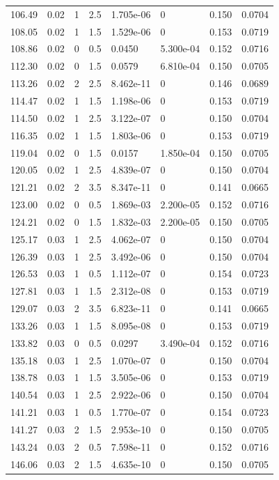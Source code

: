 \documentclass[preview]{standalone}
\begin{document}
{{{\begin{tabular}{L{1.2cm}C{1.2cm} C{0.3cm}C{0.5cm} C{1.4cm}C{1.4cm} C{1.4cm}C{1.4cm}}
  106.49  &  0.02  & 1     & 2.5 &  1.705e-06  & 0  & 0.150 &  0.0704   \\ 
  108.05  &  0.02  & 1     & 1.5 &  1.529e-06  & 0  & 0.153 &  0.0719   \\ 
  108.86  &  0.02  & 0     & 0.5 &  0.0450  & 5.300e-04  & 0.152 &  0.0716   \\ 
  112.30  &  0.02  & 0     & 1.5 &  0.0579  & 6.810e-04  & 0.150 &  0.0705   \\ 
  113.26  &  0.02  & 2     & 2.5 &  8.462e-11  & 0  & 0.146 &  0.0689   \\ 
  114.47  &  0.02  & 1     & 1.5 &  1.198e-06  & 0  & 0.153 &  0.0719   \\ 
  114.50  &  0.02  & 1     & 2.5 &  3.122e-07  & 0  & 0.150 &  0.0704   \\ 
  116.35  &  0.02  & 1     & 1.5 &  1.803e-06  & 0  & 0.153 &  0.0719   \\ 
  119.04  &  0.02  & 0     & 1.5 &  0.0157  & 1.850e-04  & 0.150 &  0.0705   \\ 
  120.05  &  0.02  & 1     & 2.5 &  4.839e-07  & 0  & 0.150 &  0.0704   \\ 
  121.21  &  0.02  & 2     & 3.5 &  8.347e-11  & 0  & 0.141 &  0.0665   \\ 
  123.00  &  0.02  & 0     & 0.5 &  1.869e-03  & 2.200e-05  & 0.152 &  0.0716   \\ 
  124.21  &  0.02  & 0     & 1.5 &  1.832e-03  & 2.200e-05  & 0.150 &  0.0705   \\ 
  125.17  &  0.03  & 1     & 2.5 &  4.062e-07  & 0  & 0.150 &  0.0704   \\ 
  126.39  &  0.03  & 1     & 2.5 &  3.492e-06  & 0  & 0.150 &  0.0704   \\ 
  126.53  &  0.03  & 1     & 0.5 &  1.112e-07  & 0  & 0.154 &  0.0723   \\ 
  127.81  &  0.03  & 1     & 1.5 &  2.312e-08  & 0  & 0.153 &  0.0719   \\ 
  129.07  &  0.03  & 2     & 3.5 &  6.823e-11  & 0  & 0.141 &  0.0665   \\ 
  133.26  &  0.03  & 1     & 1.5 &  8.095e-08  & 0  & 0.153 &  0.0719   \\ 
  133.82  &  0.03  & 0     & 0.5 &  0.0297  & 3.490e-04  & 0.152 &  0.0716   \\ 
  135.18  &  0.03  & 1     & 2.5 &  1.070e-07  & 0  & 0.150 &  0.0704   \\ 
  138.78  &  0.03  & 1     & 1.5 &  3.505e-06  & 0  & 0.153 &  0.0719   \\ 
  140.54  &  0.03  & 1     & 2.5 &  2.922e-06  & 0  & 0.150 &  0.0704   \\ 
  141.21  &  0.03  & 1     & 0.5 &  1.770e-07  & 0  & 0.154 &  0.0723   \\ 
  141.27  &  0.03  & 2     & 1.5 &  2.953e-10  & 0  & 0.150 &  0.0705   \\ 
  143.24  &  0.03  & 2     & 0.5 &  7.598e-11  & 0  & 0.152 &  0.0716   \\ 
  146.06  &  0.03  & 2     & 1.5 &  4.635e-10  & 0  & 0.150 &  0.0705   \\ 
\hline 
\end{tabular} 

}}}
\end{document}
